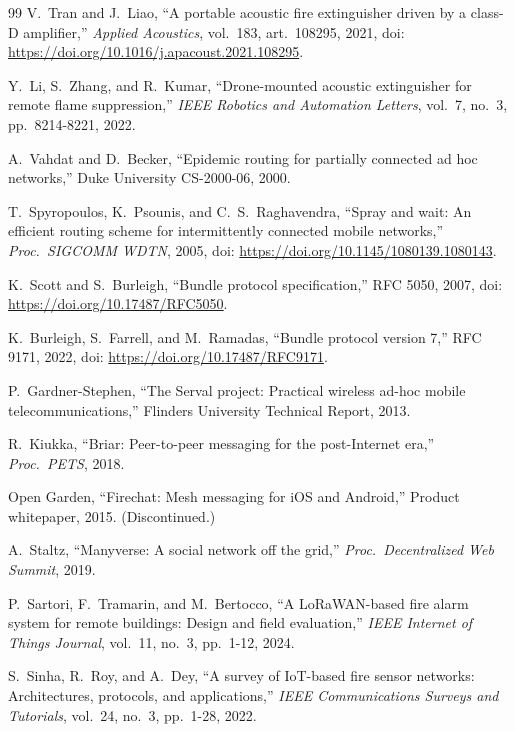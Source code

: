 \begin{thebibliography}{99}
V.~Tran and J.~Liao, ``A portable acoustic fire extinguisher driven by a class-D amplifier,''
\textit{Applied Acoustics}, vol.~183, art.~108295, 2021,
doi: \url{https://doi.org/10.1016/j.apacoust.2021.108295}.

Y.~Li, S.~Zhang, and R.~Kumar, ``Drone-mounted acoustic extinguisher for remote flame suppression,''
\textit{IEEE Robotics and Automation Letters}, vol.~7, no.~3, pp.~8214-8221, 2022.

A.~Vahdat and D.~Becker, ``Epidemic routing for partially connected ad hoc networks,''
Duke University CS-2000-06, 2000.

T.~Spyropoulos, K.~Psounis, and C.~S.~Raghavendra, ``Spray and wait: An efficient routing scheme for intermittently connected mobile networks,''
\textit{Proc.\ SIGCOMM WDTN}, 2005,
doi: \url{https://doi.org/10.1145/1080139.1080143}.

K.~Scott and S.~Burleigh, ``Bundle protocol specification,'' RFC 5050, 2007,
doi: \url{https://doi.org/10.17487/RFC5050}.

K.~Burleigh, S.~Farrell, and M.~Ramadas, ``Bundle protocol version 7,'' RFC 9171, 2022,
doi: \url{https://doi.org/10.17487/RFC9171}.

P.~Gardner-Stephen, ``The Serval project: Practical wireless ad-hoc mobile telecommunications,''
Flinders University Technical Report, 2013.

R.~Kiukka, ``Briar: Peer-to-peer messaging for the post-Internet era,''
\textit{Proc.\ PETS}, 2018.

Open Garden, ``Firechat: Mesh messaging for iOS and Android,''
Product whitepaper, 2015. (Discontinued.)

A.~Staltz, ``Manyverse: A social network off the grid,''
\textit{Proc.\ Decentralized Web Summit}, 2019.

P.~Sartori, F.~Tramarin, and M.~Bertocco, ``A LoRaWAN-based fire alarm system for remote buildings: Design and field evaluation,''
\textit{IEEE Internet of Things Journal}, vol.~11, no.~3, pp.~1-12, 2024.

S.~Sinha, R.~Roy, and A.~Dey, ``A survey of IoT-based fire sensor networks: Architectures, protocols, and applications,''
\textit{IEEE Communications Surveys and Tutorials}, vol.~24, no.~3, pp.~1-28, 2022.


\end{thebibliography}
